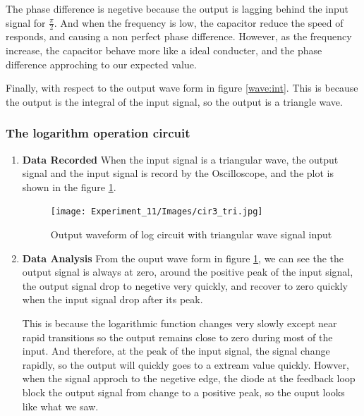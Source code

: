 \begin{enumerate}
            The phase difference is negetive because the output is lagging behind the input signal for $\frac{\pi}{2}$. And when the frequency is low, the capacitor reduce the speed of responds, and causing a non perfect phase difference. However, as the frequency increase, the capacitor behave more like a ideal conducter, and the phase difference approching to our expected value.\par

            Finally, with respect to the output wave form in figure \ref{wave:int}. This is because the output is the integral of the input signal, so the output is a triangle wave.
    \end{enumerate}

    \subsubsection{The logarithm operation circuit}
    \begin{enumerate}
        \item \textbf{Data Recorded}\newline
            When the input signal is a triangular wave, the output signal and the input signal is record by the Oscilloscope, and the plot is shown in the figure \ref{wave:log}.
            \begin{figure}[H]
                \centering
                \texttt{[image: Experiment\_11/Images/cir3\_tri.jpg]}
                \caption{Output waveform of log circuit with triangular wave signal input}
                \label{wave:log}
            \end{figure}
        \item \textbf{Data Analysis}\newline
            From the ouput wave form in figure \ref{wave:log}, we can see the the output signal is always at zero, around the positive peak of the input signal, the output signal drop to negetive very quickly, and recover to zero quickly when the input signal drop after its peak.\par

            This is because the logarithmic function changes very slowly except near rapid transitions so the output remains close to zero during most of the input. And therefore, at the peak of the input signal, the signal change rapidly, so the output will quickly goes to a extream value quickly. Howver, when the signal approch to the negetive edge, the diode at the feedback loop block the output signal from change to a positive peak, so the ouput looks like what we saw.\par
    \end{enumerate}

